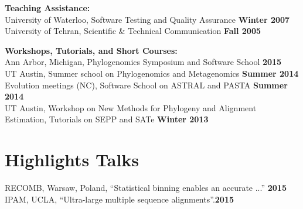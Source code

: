 \documentclass[margin,line,letterpaper]{resume}
\begin{document}
\begin{resume}
    \textbf{Teaching  Assistance:}\vspace{2mm}\\\vspace{1mm}%
    University of Waterloo, Software Testing and Quality Assurance  \hfill \textbf{Winter 2007}\vspace{1mm}\\
    University of Tehran, Scientific \& Technical Communication  \hfill \textbf{Fall 2005}


    \textbf{Workshops, Tutorials, and  Short Courses:}\vspace{2mm}\\\vspace{1mm}%
    Ann Arbor, Michigan, Phylogenomics Symposium and Software School \hfill \textbf{2015}\\
    UT Austin, Summer school on Phylogenomics and Metagenomics \hfill \textbf{Summer 2014}\\
    Evolution meetings (NC), Software School on ASTRAL and PASTA \hfill \textbf{Summer 2014}\\
    UT Austin, Workshop on New Methods for Phylogeny and Alignment Estimation, 
    Tutorials on SEPP and SATe \hfill \textbf{Winter 2013}
%

    
    
        \section{\mysidestyle Highlights Talks}
         RECOMB, Warsaw, Poland, ``Statistical binning enables an accurate ...''   \hfill \textbf{2015}\vspace{1mm}\\
         IPAM, UCLA, ``Ultra-large multiple sequence alignments''.\hfill \textbf{2015}

\end{resume}
\end{document}
